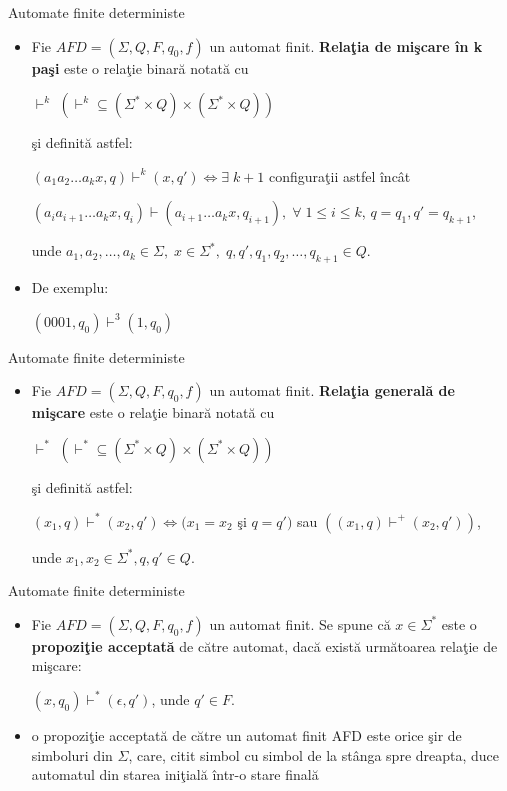 \documentclass[pdf]{beamer}
\begin{document}
\begin{frame}{Automate finite deterministe}
\begin{itemize}
\item
Fie $AFD=(\Sigma, Q, F, q_{0}, f)$ un automat finit. \textbf{Relaţia de mişcare în k paşi} este o relaţie binară notată cu 

$\vdash^{k}$ $(\vdash^{k} \subseteq (\Sigma^{*} \times Q) \times (\Sigma^{*} \times Q))$ 

şi definită astfel:

$(a_{1} a_{2} \dots a_{k} x, q) \vdash^{k} (x, q') \Leftrightarrow \exists \; k+1$ configuraţii astfel încât 

$(a_{i}a_{i+1} \dots a_{k}x, q_{i}) \vdash (a_{i+1} \dots a_{k}x, q_{i+1}), \; \forall \; 1 \leq i \leq k$, $q = q_{1}, q' = q_{k+1}$, 

unde $a_{1}, a_{2}, \dots, a_{k} \in \Sigma, \; x \in \Sigma^{*}, \; q, q', q_{1}, q_{2}, \dots, q_{k+1} \in Q$.

\item
De exemplu:

$(0001, q_0) \vdash^3 (1, q_0)$
\end{itemize}
\end{frame}



\begin{frame}{Automate finite deterministe}
\begin{itemize}
\item
Fie $AFD=(\Sigma, Q, F, q_{0}, f)$ un automat finit. \textbf{Relaţia generală de mişcare} este o relaţie binară notată cu 

$\vdash^{*}$ $(\vdash^{*} \subseteq (\Sigma^{*} \times Q) \times (\Sigma^{*} \times Q))$ 

şi definită astfel:

$(x_{1}, q) \vdash^{*} (x_{2}, q') \Leftrightarrow (x_{1} = x_{2}$ şi $q = q')$ sau $((x_{1}, q) \vdash^{+} (x_{2}, q'))$, 

unde $x_{1}, x_{2} \in \Sigma^{*}, q, q' \in Q$.
\end{itemize}
\end{frame}



\begin{frame}{Automate finite deterministe}
\begin{itemize}
\item
Fie $AFD=(\Sigma, Q, F, q_{0}, f)$ un automat finit. Se spune că $x \in \Sigma^{*}$ este o \textbf{propoziţie acceptată} de către automat, dacă există următoarea relaţie de mişcare: 

$(x, q_{0}) \vdash^* (\epsilon, q')$, unde $q' \in F$.
\item
o propoziţie acceptată de către un automat finit AFD este orice şir de simboluri din $\Sigma$, care, citit simbol cu simbol de la stânga spre dreapta, duce automatul din starea iniţială într-o stare finală
\end{itemize}
\end{frame}
\end{document}
